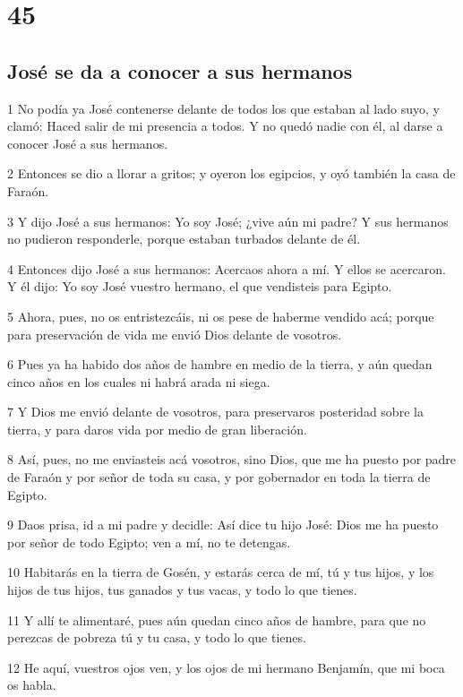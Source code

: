 \chapter{45}

\section*{José se da a conocer a sus hermanos}

\par 1 No podía ya José contenerse delante de todos los que estaban al lado suyo, y clamó: Haced salir de mi presencia a todos. Y no quedó nadie con él, al darse a conocer José a sus hermanos.
\par 2 Entonces se dio a llorar a gritos; y oyeron los egipcios, y oyó también la casa de Faraón.
\par 3 Y dijo José a sus hermanos: Yo soy José; ¿vive aún mi padre? Y sus hermanos no pudieron responderle, porque estaban turbados delante de él.
\par 4 Entonces dijo José a sus hermanos: Acercaos ahora a mí. Y ellos se acercaron. Y él dijo: Yo soy José vuestro hermano, el que vendisteis para Egipto.
\par 5 Ahora, pues, no os entristezcáis, ni os pese de haberme vendido acá; porque para preservación de vida me envió Dios delante de vosotros.
\par 6 Pues ya ha habido dos años de hambre en medio de la tierra, y aún quedan cinco años en los cuales ni habrá arada ni siega.
\par 7 Y Dios me envió delante de vosotros, para preservaros posteridad sobre la tierra, y para daros vida por medio de gran liberación.
\par 8 Así, pues, no me enviasteis acá vosotros, sino Dios, que me ha puesto por padre de Faraón y por señor de toda su casa, y por gobernador en toda la tierra de Egipto.
\par 9 Daos prisa, id a mi padre y decidle: Así dice tu hijo José: Dios me ha puesto por señor de todo Egipto; ven a mí, no te detengas.
\par 10 Habitarás en la tierra de Gosén, y estarás cerca de mí, tú y tus hijos, y los hijos de tus hijos, tus ganados y tus vacas, y todo lo que tienes.
\par 11 Y allí te alimentaré, pues aún quedan cinco años de hambre, para que no perezcas de pobreza tú y tu casa, y todo lo que tienes.
\par 12 He aquí, vuestros ojos ven, y los ojos de mi hermano Benjamín, que mi boca os habla.
